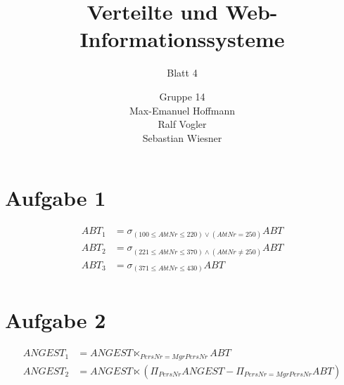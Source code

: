 \documentclass[11pt,a4paper]{scrartcl}
\begin{document}
\author{Gruppe 14\\Max-Emanuel Hoffmann\\Ralf Vogler\\Sebastian Wiesner}
\title{Verteilte und Web-Informationssysteme}
\subtitle{Blatt 4}

\maketitle

\section*{Aufgabe 1}

\begin{align*}
  ABT_1 &= \sigma_{(100 \leq AbtNr \leq 220) \vee (AbtNr = 250)} ABT \\
  ABT_2 &= \sigma_{(221 \leq AbtNr \leq 370) \wedge (AbtNr \neq 250)} ABT \\
  ABT_3 &= \sigma_{(371 \leq AbtNr \leq 430)} ABT \\
\end{align*}

\section*{Aufgabe 2}

\begin{align*}
  ANGEST_1 &= ANGEST \ltimes_{PersNr=MgrPersNr} ABT \\
  ANGEST_2 &= ANGEST \ltimes (\Pi_{PersNr}ANGEST -
  \Pi_{PersNr=MgrPersNr}
  ABT) \\
\end{align*}
\end{document}
